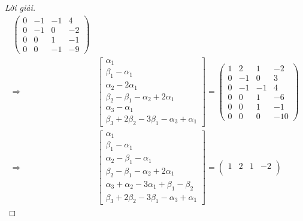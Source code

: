 \documentclass[class=linearalgebra,crop=false]{standalone}
\begin{document}
\begin{proof}[Lời giải]
\begin{align*}
\begin{pmatrix}
            0 & -1 & -1 & 4  \\
            0 & -1 & 0  & -2 \\
            0 & 0  & 1  & -1 \\
            0 & 0  & -1 & -9
        \end{pmatrix}                 \\
        \Longrightarrow &
        \begin{bmatrix}
            \alpha_{1}                                       \\
            \beta_{1} - \alpha_{1}                           \\
            \alpha_{2} - 2\alpha_{1}                         \\
            \beta_{2} - \beta_{1} - \alpha_{2} + 2\alpha_{1} \\
            \alpha_{3} - \alpha_{1}                          \\
            \beta_{3} + 2\beta_{2} - 3\beta_{1} - \alpha_{3} + \alpha_{1}
        \end{bmatrix}=
        \begin{pmatrix}
            1 & 2  & 1  & -2  \\
            0 & -1 & 0  & 3   \\
            0 & -1 & -1 & 4   \\
            0 & 0  & 1  & -6  \\
            0 & 0  & 1  & -1  \\
            0 & 0  & 0  & -10
        \end{pmatrix}                \\
        \Longrightarrow &
        \begin{bmatrix}
            \alpha_{1}                                                    \\
            \beta_{1} - \alpha_{1}                                        \\
            \alpha_{2} - \beta_{1} - \alpha_{1}                           \\
            \beta_{2} - \beta_{1} - \alpha_{2} + 2\alpha_{1}              \\
            \alpha_{3} + \alpha_{2} - 3\alpha_{1} + \beta_{1} - \beta_{2} \\
            \beta_{3} + 2\beta_{2} - 3\beta_{1} - \alpha_{3} + \alpha_{1}
        \end{bmatrix}=
        \begin{pmatrix}
            1 & 2  & 1  & -2  \\

\end{pmatrix}
\end{align*}
\end{proof}
\end{document}
